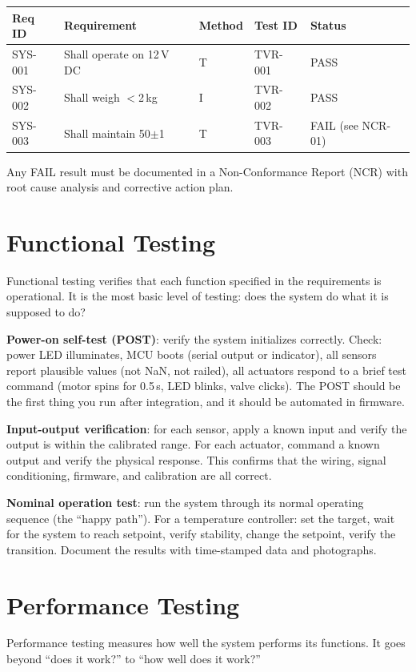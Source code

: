 \begin{greenshieldbox}
\begin{tabularx}{\linewidth}{l l l l l}
\toprule
\textbf{Req ID} & \textbf{Requirement} & \textbf{Method} & \textbf{Test ID} & \textbf{Status} \\
\midrule
SYS-001 & Shall operate on 12\,V DC & T & TVR-001 & PASS \\
SYS-002 & Shall weigh $<$2\,kg & I & TVR-002 & PASS \\
SYS-003 & Shall maintain 50$\pm$1\,\degC{} & T & TVR-003 & FAIL (see NCR-01) \\
\bottomrule
\end{tabularx}
Any FAIL result must be documented in a Non-Conformance Report (NCR) with root cause analysis and corrective action plan.
\end{greenshieldbox}

\section{Functional Testing}
Functional testing verifies that each function specified in the requirements is operational. It is the most basic level of testing: does the system do what it is supposed to do?

\textbf{Power-on self-test (POST)}: verify the system initializes correctly. Check: power LED illuminates, MCU boots (serial output or indicator), all sensors report plausible values (not NaN, not railed), all actuators respond to a brief test command (motor spins for 0.5\,s, LED blinks, valve clicks). The POST should be the first thing you run after integration, and it should be automated in firmware.

\textbf{Input-output verification}: for each sensor, apply a known input and verify the output is within the calibrated range. For each actuator, command a known output and verify the physical response. This confirms that the wiring, signal conditioning, firmware, and calibration are all correct.

\textbf{Nominal operation test}: run the system through its normal operating sequence (the ``happy path''). For a temperature controller: set the target, wait for the system to reach setpoint, verify stability, change the setpoint, verify the transition. Document the results with time-stamped data and photographs.

\section{Performance Testing}
Performance testing measures how well the system performs its functions. It goes beyond ``does it work?'' to ``how well does it work?''

